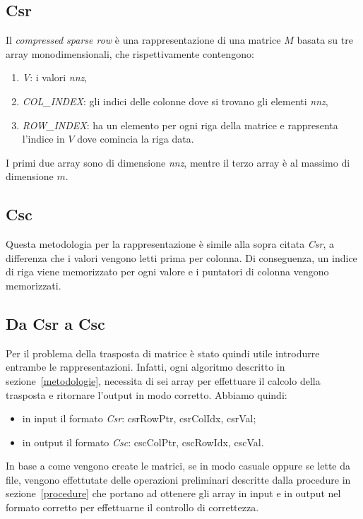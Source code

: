 \documentclass[]{IEEEtran}
\begin{document}
	\subsection{Csr}
	\label{csr}
	Il \textit{compressed sparse row} è una rappresentazione di una matrice $ M $ basata su tre array monodimensionali, che rispettivamente contengono:
	\begin{enumerate}
		\item \textit{V}: i valori \textit{nnz},
		\item \textit{COL\_INDEX}: gli indici delle colonne dove si trovano gli elementi \textit{nnz},
		\item \textit{ROW\_INDEX}: ha un elemento per ogni riga della matrice e rappresenta l'indice in $ V $ dove comincia la riga data.
	\end{enumerate}
	I primi due array sono di dimensione \textit{nnz}, mentre il terzo array è al massimo di dimensione $ m $.
	
	\subsection{Csc}
	\label{csc}
 	Questa metodologia per la rappresentazione è simile alla sopra citata \textit{Csr}, a differenza che i valori vengono letti prima per colonna. Di conseguenza, un indice di riga viene memorizzato per ogni valore e i puntatori di colonna vengono memorizzati.
 	
	\subsection{Da Csr a Csc}
	\label{csr-to-csc}
 	Per il problema della trasposta di matrice è stato quindi utile introdurre entrambe le rappresentazioni. Infatti, ogni algoritmo  descritto in sezione~\ref{metodologie}, necessita di sei array per effettuare il calcolo della trasposta e ritornare l'output in modo corretto. Abbiamo quindi:
 	\begin{itemize}
 		\item in input il formato \textit{Csr}: csrRowPtr, csrColIdx, csrVal;
 		\item in output il formato \textit{Csc}: cscColPtr, cscRowIdx, cscVal.	
 	\end{itemize}
 	In base a come vengono create le matrici, se in modo casuale oppure se lette da file, vengono effettutate delle operazioni preliminari descritte dalla procedure in sezione~\ref{procedure} che portano ad ottenere gli array in input e in output nel formato corretto per effettuarne il controllo di correttezza.\newline
	
\end{document}
